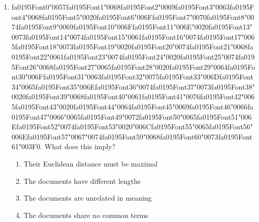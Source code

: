 \documentclass[12pt]{article}
\begin{document}
\begin{enumerate}[label=Q\arabic*.]
 \item {\csname fa0195Font0\endcsname\char"0057}{\csname fa0195Font1\endcsname\char"0068}{\csname fa0195Font2\endcsname\char"0069}{\csname fa0195Font3\endcsname\char"0063}{\csname fa0195Font4\endcsname\char"0068}{\csname fa0195Font5\endcsname\char"0020}{\csname fa0195Font6\endcsname\char"006F}{\csname fa0195Font7\endcsname\char"0070}{\csname fa0195Font8\endcsname\char"0074}{\csname fa0195Font9\endcsname\char"0069}{\csname fa0195Font10\endcsname\char"006F}{\csname fa0195Font11\endcsname\char"006E}{\char"0020}{\csname fa0195Font13\endcsname\char"0073}{\csname fa0195Font14\endcsname\char"0074}{\csname fa0195Font15\endcsname\char"0061}{\csname fa0195Font16\endcsname\char"0074}{\csname fa0195Font17\endcsname\char"0065}{\csname fa0195Font18\endcsname\char"0073}{\csname fa0195Font19\endcsname\char"0020}{\csname fa0195Font20\endcsname\char"0074}{\csname fa0195Font21\endcsname\char"0068}{\csname fa0195Font22\endcsname\char"0061}{\csname fa0195Font23\endcsname\char"0074}{\csname fa0195Font24\endcsname\char"0020}{\csname fa0195Font25\endcsname\char"0074}{\csname fa0195Font26\endcsname\char"0068}{\csname fa0195Font27\endcsname\char"0065}{\csname fa0195Font28\endcsname\char"0020}{\csname fa0195Font29\endcsname\char"0064}{\csname fa0195Font30\endcsname\char"006F}{\csname fa0195Font31\endcsname\char"0063}{\csname fa0195Font32\endcsname\char"0075}{\csname fa0195Font33\endcsname\char"006D}{\csname fa0195Font34\endcsname\char"0065}{\csname fa0195Font35\endcsname\char"006E}{\csname fa0195Font36\endcsname\char"0074}{\csname fa0195Font37\endcsname\char"0073}{\csname fa0195Font38\endcsname\char"0020}{\csname fa0195Font39\endcsname\char"0068}{\csname fa0195Font40\endcsname\char"0061}{\csname fa0195Font41\endcsname\char"0076}{\csname fa0195Font42\endcsname\char"0065}{\csname fa0195Font43\endcsname\char"0020}{\csname fa0195Font44\endcsname\char"0064}{\csname fa0195Font45\endcsname\char"0069}{\csname fa0195Font46\endcsname\char"0066}{\csname fa0195Font47\endcsname\char"0066}{\char"0065}{\csname fa0195Font49\endcsname\char"0072}{\csname fa0195Font50\endcsname\char"0065}{\csname fa0195Font51\endcsname\char"006E}{\csname fa0195Font52\endcsname\char"0074}{\csname fa0195Font53\endcsname\char"0020}{\char"006C}{\csname fa0195Font55\endcsname\char"0065}{\csname fa0195Font56\endcsname\char"006E}{\csname fa0195Font57\endcsname\char"0067}{\char"0074}{\csname fa0195Font59\endcsname\char"0068}{\csname fa0195Font60\endcsname\char"0073}{\csname fa0195Font61\endcsname\char"003F}$0$. What does this imply?
 \begin{enumerate}[label=(\Alph*)]
     \item Their Euclidean distance must be maximal
     \item The documents have different lengths
     \item The documents are unrelated in meaning
     \item The documents share no common terms
 \end{enumerate}
 

\end{enumerate}
\end{document}

